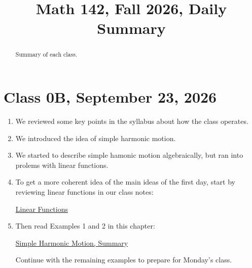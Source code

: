 \documentclass{ximera}
\title{Math 142, Fall 2026, Daily Summary}
\begin{document}
\begin{abstract}
Summary of each class.
\end{abstract}
\maketitle

\section{Class 0B, September 23, 2026}

\begin{enumerate}
\item We reviewed some key points in the syllabus about how the class operates.

\item We introduced the idea of simple harmonic motion.

\item We started to describe simple hamonic motion algebraically, but ran into prolems with linear functions.

\item To get a more coherent idea of the main ideas of the first day, start by reviewing linear functions in our class notes:

\href{https://ximera.osu.edu/precalc2/PreCalculus2/LinearFunctions/LinearFunctions}{Linear Functions}

\item Then read Examples 1 and 2 in this chapter:

\href{https://ximera.osu.edu/precalc2/PreCalculus2/SHMShort/SHMShort}{Simple Harmonic Motion, Summary}

Continue with the remaining examples to prepare for Monday's class.
 
\end{enumerate}
\end{document}
